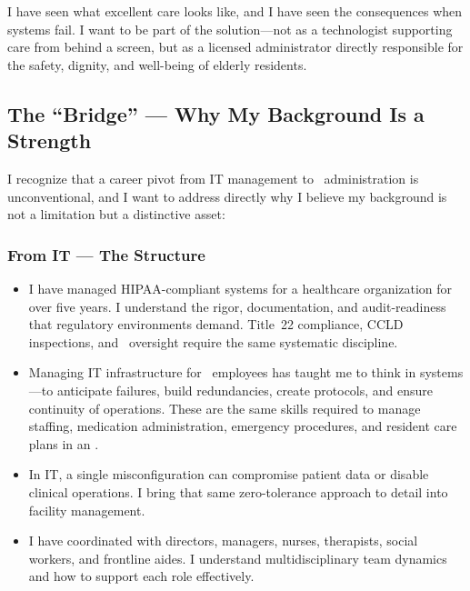 I have seen what excellent care looks like, and I have seen the consequences when systems fail. I want to be part of the solution---not as a technologist supporting care from behind a screen, but as a licensed administrator directly responsible for the safety, dignity, and well-being of elderly residents.

\subsection{The ``Bridge'' --- Why My Background Is a Strength}

I recognize that a career pivot from IT management to \FacilityTypeShort\ administration is unconventional, and I want to address directly why I believe my background is not a limitation but a distinctive asset:

\subsubsection{From IT --- The Structure}
\begin{itemize}[leftmargin=2em, itemsep=0.2em]
  \item {} I have managed HIPAA-compliant systems for a healthcare organization for over five years. I understand the rigor, documentation, and audit-readiness that regulatory environments demand. Title~22 compliance, CCLD inspections, and \BranchAbbrev\ oversight require the same systematic discipline.
  \item {} Managing IT infrastructure for \TeamSize\ employees has taught me to think in systems---to anticipate failures, build redundancies, create protocols, and ensure continuity of operations. These are the same skills required to manage staffing, medication administration, emergency procedures, and resident care plans in an \FacilityTypeShort.
  \item {} In IT, a single misconfiguration can compromise patient data or disable clinical operations. I bring that same zero-tolerance approach to detail into facility management.
  \item {} I have coordinated with directors, managers, nurses, therapists, social workers, and frontline aides. I understand multidisciplinary team dynamics and how to support each role effectively.
\end{itemize}

